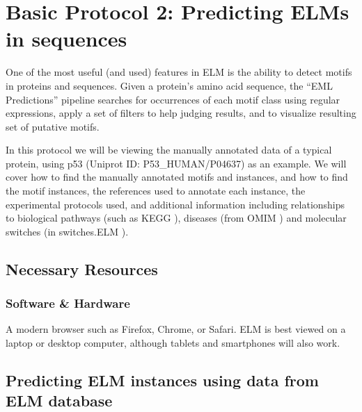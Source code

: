 \section{Basic Protocol 2: Predicting ELMs in
sequences}\label{basic-protocol-2-predicting-elms-in-sequences}

One of the most useful (and used) features in ELM is the ability to
detect motifs in proteins and sequences. Given a protein's amino acid
sequence, the ``EML Predictions'' pipeline searches for occurrences of
each motif class using regular expressions, apply a set of filters to
help judging results, and to visualize resulting set of putative motifs.

In this protocol we will be viewing the manually annotated data of a
typical protein, using p53 (Uniprot ID: P53\_HUMAN/P04637) as an
example. We will cover how to find the manually annotated motifs and
instances, and how to find the motif instances, the references used to
annotate each instance, the experimental protocols used, and additional
information including relationships to biological pathways (such as KEGG
\cite{26476454}), diseases (from OMIM \cite{17357067}) and molecular
switches (in switches.ELM \cite{23550212}).

\subsection{Necessary Resources}\label{necessary-resources}

\subsubsection{Software \& Hardware}\label{software-hardware}

A modern browser such as Firefox, Chrome, or Safari. ELM is best viewed
on a laptop or desktop computer, although tablets and smartphones will
also work.

\subsection{Predicting ELM instances using data from ELM
database}\label{predicting-elm-instances-using-data-from-elm-database}

